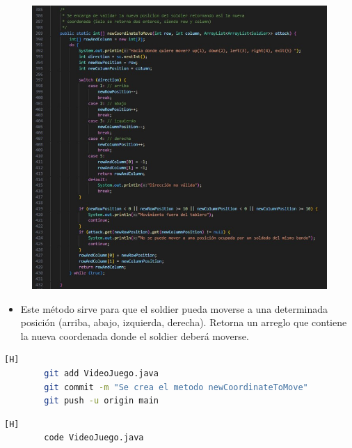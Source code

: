 \documentclass{article}
\begin{document}
	\begin{figure}[H]
		\centering
		\includegraphics[width=1\textwidth,keepaspectratio]{img/newCoordinate.jpg}
	\end{figure}
	
	
	\begin{itemize}	
		\item Este método sirve para que el soldier pueda moverse a una determinada posición (arriba, abajo, izquierda, derecha). Retorna un arreglo que contiene la nueva coordenada donde el soldier deberá moverse.
	\end{itemize}
	
	\begin{lstlisting}[language=bash,caption={Commit: ae376e9c6b501f2d37a8979eb6f488a5b4ce4890}][H]
		git add VideoJuego.java
		git commit -m "Se crea el metodo newCoordinateToMove"			
		git push -u origin main
	\end{lstlisting}
	


	\begin{lstlisting}[language=bash,caption={Se implementa el método que mueve al Soldier a otra casilla}][H]
		code VideoJuego.java
	\end{lstlisting}
	
\end{document}
